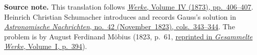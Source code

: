 \par\medskip\begin{small}\noindent\textbf{Source note.} This translation follows \href{https://gdz.sub.uni-goettingen.de/id/PPN236005081}{\textit{Werke}, Volume~IV (1873), pp.~406--407}. Heinrich Christian Schumacher introduces and records Gauss’s solution in \href{https://www.digitale-sammlungen.de/de/view/bsb10049427?page=204}{\textit{Astronomische Nachrichten}, no.~42 (November~1823), cols.~343--344}. The problem is by August Ferdinand Möbius (1823, p.~61, \href{https://www.e-rara.ch/download/pdf/5633522.pdf}{reprinted in \textit{Gesammelte Werke}, Volume~I, p.~394}).\par\end{small}
